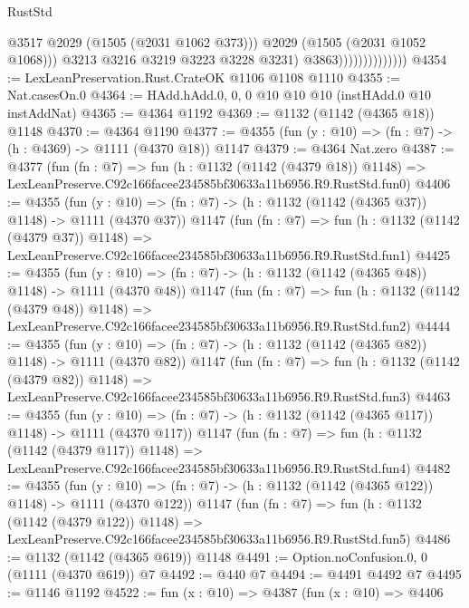 \begin{lexlean}{RustStd}
\begin{coremodule}
                                      @3517
                                      @2029
                                      (@1505 (@2031 @1062 @373)))
                                    @2029
                                    (@1505 (@2031 @1052 @1068)))
                                  @3213
                                  @3216
                                  @3219
                                  @3223
                                  @3228
                                  @3231)
                                @3863))))))))))))))
@4354 := LexLeanPreservation.Rust.CrateOK @1106 @1108 @1110
@4355 := Nat.casesOn.{0}
@4364 := HAdd.hAdd.{0, 0, 0} @10 @10 @10 (instHAdd.{0} @10 instAddNat)
@4365 := @4364 @1192
@4369 := @1132 (@1142 (@4365 @18)) @1148
@4370 := @4364 @1190
@4377 := @4355 (fun (y : @10) => (fn : @7) -> (h : @4369) -> @1111 (@4370 @18)) @1147
@4379 := @4364 Nat.zero
@4387 := @4377
    (fun (fn : @7) =>
    fun (h : @1132 (@1142 (@4379 @18)) @1148) =>
    LexLeanPreserve.C92c166facee234585bf30633a11b6956.R9.RustStd.fun0)
@4406 := @4355
    (fun (y : @10) => (fn : @7) -> (h : @1132 (@1142 (@4365 @37)) @1148) -> @1111 (@4370 @37))
    @1147
    (fun (fn : @7) =>
    fun (h : @1132 (@1142 (@4379 @37)) @1148) =>
    LexLeanPreserve.C92c166facee234585bf30633a11b6956.R9.RustStd.fun1)
@4425 := @4355
    (fun (y : @10) => (fn : @7) -> (h : @1132 (@1142 (@4365 @48)) @1148) -> @1111 (@4370 @48))
    @1147
    (fun (fn : @7) =>
    fun (h : @1132 (@1142 (@4379 @48)) @1148) =>
    LexLeanPreserve.C92c166facee234585bf30633a11b6956.R9.RustStd.fun2)
@4444 := @4355
    (fun (y : @10) => (fn : @7) -> (h : @1132 (@1142 (@4365 @82)) @1148) -> @1111 (@4370 @82))
    @1147
    (fun (fn : @7) =>
    fun (h : @1132 (@1142 (@4379 @82)) @1148) =>
    LexLeanPreserve.C92c166facee234585bf30633a11b6956.R9.RustStd.fun3)
@4463 := @4355
    (fun (y : @10) => (fn : @7) -> (h : @1132 (@1142 (@4365 @117)) @1148) -> @1111 (@4370 @117))
    @1147
    (fun (fn : @7) =>
    fun (h : @1132 (@1142 (@4379 @117)) @1148) =>
    LexLeanPreserve.C92c166facee234585bf30633a11b6956.R9.RustStd.fun4)
@4482 := @4355
    (fun (y : @10) => (fn : @7) -> (h : @1132 (@1142 (@4365 @122)) @1148) -> @1111 (@4370 @122))
    @1147
    (fun (fn : @7) =>
    fun (h : @1132 (@1142 (@4379 @122)) @1148) =>
    LexLeanPreserve.C92c166facee234585bf30633a11b6956.R9.RustStd.fun5)
@4486 := @1132 (@1142 (@4365 @619)) @1148
@4491 := Option.noConfusion.{0, 0} (@1111 (@4370 @619)) @7
@4492 := @440 @7
@4494 := @4491 @4492 @7
@4495 := @1146 @1192
@4522 := fun (x : @10) =>
  @4387
    (fun (x : @10) =>
    @4406

\end{coremodule}
\end{lexlean}
